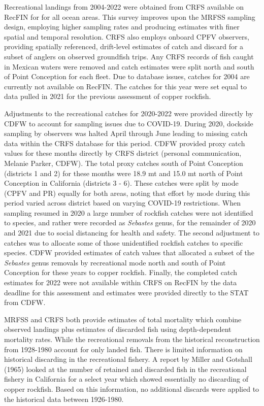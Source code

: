 \documentclass[11pt,
  english,
  letterpaper,
]{article}
\begin{document}
Recreational landings from 2004-2022 were obtained from CRFS available on RecFIN for for all ocean areas. This survey improves upon the MRFSS sampling design, employing higher sampling rates and producing estimates with finer spatial and temporal resolution. CRFS also employs onboard CPFV observers, providing spatially referenced, drift-level estimates of catch and discard for a subset of anglers on observed groundfish trips. Any CRFS records of fish caught in Mexican waters were removed and catch estimates were split north and south of Point Conception for each fleet. Due to database issues, catches for 2004 are currently not available on RecFIN. The catches for this year were set equal to data pulled in 2021 for the previous assessment of copper rockfish.

Adjustments to the recreational catches for 2020-2022 were provided directly by CDFW to account for sampling issues due to COVID-19. During 2020, dockside sampling by observers was halted April through June leading to missing catch data within the CRFS database for this period. CDFW provided proxy catch values for these months directly by CRFS district (personal communication, Melanie Parker, CDFW). The total proxy catches south of Point Conception (districts 1 and 2) for these months were 18.9 mt and 15.0 mt north of Point Conception in California (districts 3 - 6). These catches were split by mode (CPFV and PR) equally for both areas, noting that effort by mode during this period varied across district based on varying COVID-19 restrictions. When sampling resumed in 2020 a large number of rockfish catches were not identified to species, and rather were recorded as \emph{Sebastes} genus, for the remainder of 2020 and 2021 due to social distancing for health and safety. The second adjustment to catches was to allocate some of those unidentified rockfish catches to specific species. CDFW provided estimates of catch values that allocated a subset of the \emph{Sebastes} genus removals by recreational mode north and south of Point Conception for these years to copper rockfish. Finally, the completed catch estimates for 2022 were not available within CRFS on RecFIN by the data deadline for this assessment and estimates were provided directly to the STAT from CDFW.

MRFSS and CRFS both provide estimates of total mortality which combine observed landings plus estimates of discarded fish using depth-dependent mortality rates. While the recreational removals from the historical reconstruction from 1928-1980 account for only landed fish. There is limited information on historical discarding in the recreational fishery. A report by Miller and Gotshall (1965) looked at the number of retained and discarded fish in the recreational fishery in California for a select year which showed essentially no discarding of copper rockfish. Based on this information, no additional discards were applied to the historical data between 1926-1980.
\end{document}
